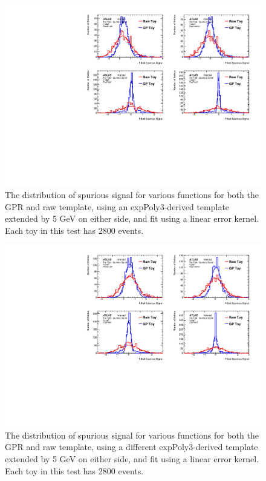 \begin{figure} 
\begin{center}
  \includegraphics[width=\textwidth]{figures/background/gpr/validation/linear/ToyTest_FitSigVals_medpT_2800_noSig}   
\caption{The distribution of spurious signal for various functions for both the GPR and raw template, using an expPoly3-derived template extended by 5 GeV on either side, and fit using a linear error kernel. Each toy in this test has 2800 events.}
\label{fig:linearkernel_medpt_2800_noSig}
\end{center}
\end{figure}

\begin{figure} 
\begin{center}
  \includegraphics[width=\textwidth]{figures/background/gpr/validation/linear/ToyTest_FitSigVals_highpT_2800_noSig}   
\caption{The distribution of spurious signal for various functions for both the GPR and raw template, using a different expPoly3-derived template extended by 5 GeV on either side, and fit using a linear error kernel. Each toy in this test has 2800 events.}
\label{fig:linearkernel_highpt_2800_noSig}
\end{center}
\end{figure}

